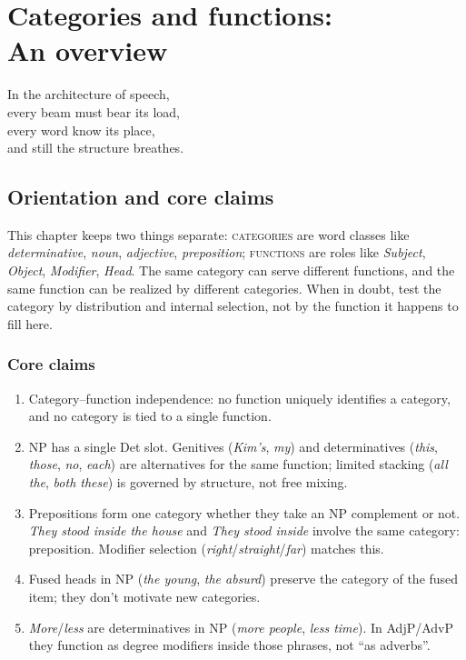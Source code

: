 \chapter{Categories and functions: \\An overview} \label{ch:categories}

\epigraph{In the architecture of speech,\\
every beam must bear its load,\\
every word know its place,\\
and still the structure breathes.}{}

\section*{Orientation and core claims}\label{sec:cat-func-orientation}
This chapter keeps two things separate: \textsc{categories} are word classes like \textit{determinative}, \textit{noun}, \textit{adjective}, \textit{preposition}; \textsc{functions} are roles like \textit{Subject}, \textit{Object}, \textit{Modifier}, \textit{Head}. The same category can serve different functions, and the same function can be realized by different categories. When in doubt, test the category by distribution and internal selection, not by the function it happens to fill here. 

\subsection*{Core claims}\label{subsec:cat-func-claims}
\begin{enumerate}
  \item Category–function independence: no function uniquely identifies a category, and no category is tied to a single function. 
  \item NP has a single Det slot. Genitives (\textit{Kim's}, \textit{my}) and determinatives (\textit{this}, \textit{those}, \textit{no}, \textit{each}) are alternatives for the same function; limited stacking (\textit{all the}, \textit{both these}) is governed by structure, not free mixing. 
  \item Prepositions form one category whether they take an NP complement or not. \textit{They stood inside the house} and \textit{They stood inside} involve the same category: preposition. Modifier selection (\textit{right}/\textit{straight}/\textit{far}) matches this. 
  \item Fused heads in NP (\textit{the young}, \textit{the absurd}) preserve the category of the fused item; they don't motivate new categories. 
  \item \textit{More}/\textit{less} are determinatives in NP (\textit{more people}, \textit{less time}). In AdjP/AdvP they function as degree modifiers inside those phrases, not ``as adverbs''. 
\end{enumerate}

